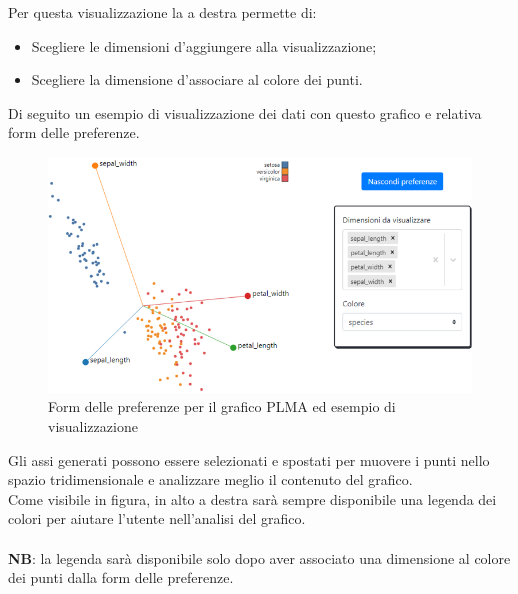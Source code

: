 Per questa visualizzazione la  a destra permette di:
\begin{itemize}
	\item Scegliere le dimensioni d'aggiungere alla visualizzazione;
	\item Scegliere la dimensione d'associare al colore dei punti.
\end{itemize} 

Di seguito un esempio di visualizzazione dei dati con questo grafico e relativa form delle preferenze.
\begin{figure}[H]
		\includegraphics[scale=0.9]{Images/plmad.png}
		\centering
		\caption{Form delle preferenze per il grafico PLMA ed esempio di visualizzazione}
\end{figure}

Gli assi generati possono essere selezionati e spostati per muovere i punti nello spazio tridimensionale e analizzare meglio il contenuto del grafico. \\
Come visibile in figura, in alto a destra sarà sempre disponibile una legenda dei colori per aiutare l'utente nell'analisi del grafico.\\\mbox{}\\ \textbf{NB}: la legenda sarà disponibile solo dopo aver associato una dimensione al colore dei punti dalla form delle preferenze.\\
\mbox{}\\

\newpage
